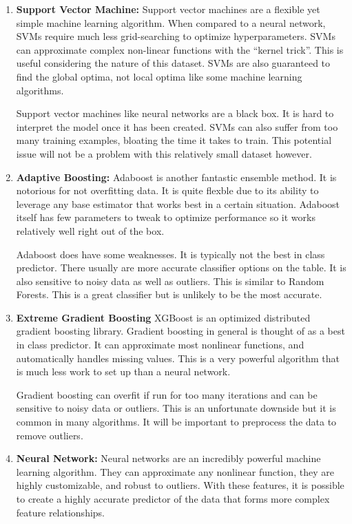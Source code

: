 \documentclass[11pt]{article}
\begin{document}
	\begin{enumerate}
		
		\item \textbf{Support Vector Machine:} Support vector machines are a flexible yet simple machine learning algorithm. When compared to a neural network, SVMs require much less grid-searching to optimize hyperparameters. SVMs can approximate complex non-linear functions with the ``kernel trick''. This is useful considering the nature of this dataset. SVMs are also guaranteed to find the global optima, not local optima like some machine learning algorithms.
		
		Support vector machines like neural networks are a black box. It is hard to interpret the model once it has been created. SVMs can also suffer from too many training examples, bloating the time it takes to train. This potential issue will not be a problem with this relatively small dataset however.
		
		\item \textbf{Adaptive Boosting:} Adaboost is another fantastic ensemble method. It is notorious for not overfitting data. It is quite flexble due to its ability to leverage any base estimator that works best in a certain situation. Adaboost itself has few parameters to tweak to optimize performance so it works relatively well right out of the box.
		
		Adaboost does have some weaknesses. It is typically not the best in class predictor. There usually are more accurate classifier options on the table. It is also sensitive to noisy data as well as outliers. This is similar to Random Forests. This is a great classifier but is unlikely to be the most accurate.
		
		\item \textbf{Extreme Gradient Boosting} XGBoost is an optimized distributed gradient boosting library. Gradient boosting in general is thought of as a best in class predictor. It can approximate most nonlinear functions, and automatically handles missing values. This is a very powerful algorithm that is much less work to set up than a neural network.
		
		Gradient boosting can overfit if run for too many iterations and can be sensitive to noisy data or outliers. This is an unfortunate downside but it is common in many algorithms. It will be important to preprocess the data to remove outliers.
		
		\item \textbf{Neural Network:} Neural networks are an incredibly powerful machine learning algorithm. They can approximate any nonlinear function, they are highly customizable, and robust to outliers. With these features, it is possible to create a highly accurate predictor of the data that forms more complex feature relationships.
		

\end{enumerate}
\end{document}
